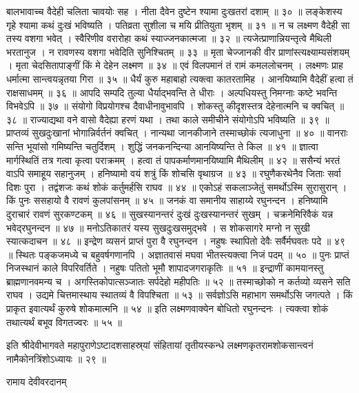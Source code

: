 बालभावाच्च वैदेही चलिता चावयोः सह ।
नीता दैवेन दुष्टेन श्यामा दुःखतरां दशाम् ॥ ३० ॥
लङ्केशस्य गृहे श्यामा कथं दुःखं भविष्यति ।
पतिव्रता सुशीला च मयि प्रीतियुता भृशम् ॥ ३१ ॥
न च लक्ष्मण वैदेही सा तस्य वशगा भवेत् ।
स्वैरिणीव वरारोहा कथं स्याज्जनकात्मजा ॥ ३२ ॥
त्यजेत्प्राणान्नियन्तृत्वे मैथिली भरतानुज ।
न रावणस्य वशगा भवेदिति सुनिश्चितम् ॥ ३३ ॥
मृता चेज्जानकी वीर प्राणांस्त्यक्ष्याम्यसंशयम् ।
मृता चेदसितापाङ्गीं किं मे देहेन लक्ष्मण ॥ ३४ ॥
एवं विलपमानं तं रामं कमललोचनम् ।
लक्ष्मणः प्राह धर्मात्मा सान्त्वयन्नृतया गिरा ॥ ३५ ॥
धैर्यं कुरु महाबाहो त्यक्त्वा कातरतामिह ।
आनयिष्यामि वैदेहीं हत्वा तं राक्षसाधमम् ॥ ३६ ॥
आपदि सम्पदि तुल्या धैर्याद्‌भवन्ति ते धीराः ।
अल्पधियस्तु निमग्नाः कष्टे भवन्ति विभवेऽपि ॥ ३७ ॥
संयोगो विप्रयोगश्च दैवाधीनावुभावपि ।
शोकस्तु कीदृशस्तत्र देहेनात्मनि च क्वचित् ॥ ३८ ॥
राज्याद्यथा वने वासो वैदेह्या हरणं यथा ।
तथा काले समीचीने संयोगोऽपि भविष्यति ॥ ३९ ॥
प्राप्तव्यं सुखदुःखानां भोगान्निर्वर्तनं क्वचित् ।
नान्यथा जानकीजाने तस्माच्छोकं त्यजाधुना ॥ ४० ॥
वानराः सन्ति भूयांसो गमिष्यन्ति चतुर्दिशम् ।
शुद्धिं जनकनन्दिन्या आनयिष्यन्ति ते किल ॥ ४१ ॥
ज्ञात्वा मार्गस्थितिं तत्र गत्वा कृत्वा पराक्रमम् ।
हत्वा तं पापकर्माणमानयिष्यामि मैथिलीम् ॥ ४२ ॥
ससैन्यं भरतं वाऽपि समाहूय सहानुजम् ।
हनिष्यामो वयं शत्रुं किं शोचसि वृथाग्रज ॥ ४३ ॥
रघुणैकरथेनैव जिताः सर्वा दिशः पुरा ।
तद्वंशजः कथं शोकं कर्तुमर्हसि राघव ॥ ४४ ॥
एकोऽहं सकलाञ्जेतुं समर्थोऽस्मि सुरासुरान् ।
किं पुनः ससहायो वै रावणं कुलपांसनम् ॥ ४५ ॥
जनकं वा समानीय साहाय्ये रघुनन्दन ।
हनिष्यामि दुराचारं रावणं सुरकण्टकम् ॥ ४६ ॥
सुखस्यानन्तरं दुःखं दुःखस्यानन्तरं सुखम् ।
चक्रनेमिरिवैकं यन्न भवेद्‌रघुनन्दन ॥ ४७ ॥
मनोऽतिकातरं यस्य सुखदुःखसमुद्‌भवे ।
स शोकसागरे मग्नो न सुखी स्यात्कदाचन ॥ ४८ ॥
इन्द्रेण व्यसनं प्राप्तं पुरा वै रघुनन्दन ।
नहुषः स्थापितो देवैः सर्वैर्मघवतः पदे ॥ ४९ ॥
स्थितः पङ्कजमध्ये च बहुवर्षगणानपि ।
अज्ञातवासं मघवा भीतस्त्यक्त्वा निजं पदम् ॥ ५० ॥
पुनः प्राप्तं निजस्थानं काले विपरिवर्तिते ।
नहुषः पतितो भूमौ शापादजगराकृतिः ॥ ५१ ॥
इन्द्राणीं कामयानस्तु ब्राह्मणानवमन्य च ।
अगस्तिकोपात्सञ्जातः सर्पदेहो महीपतिः ॥ ५२ ॥
तस्माच्छोको न कर्तव्यो व्यसने सति राघव ।
उद्यमे चित्तमास्थाय स्थातव्यं वै विपश्चिता ॥ ५३ ॥
सर्वज्ञोऽसि महाभाग समर्थोऽसि जगत्पते ।
किं प्राकृत इवात्यर्थं कुरुषे शोकमात्मनि ॥ ५४ ॥
इति लक्ष्मणवाक्येन बोधितो रघुनन्दनः ।
त्यक्त्वा शोकं तथात्यर्थं बभूव विगतज्वरः ॥ ५५ ॥


इति श्रीदेवीभागवते महापुराणेऽष्टादशसाहस्र्यां संहितायां तृतीयस्कन्धे लक्ष्मणकृतरामशोकसान्त्वनं नामैकोनत्रिंशोऽध्यायः ॥ २९ ॥


रामाय देवीवरदानम्

